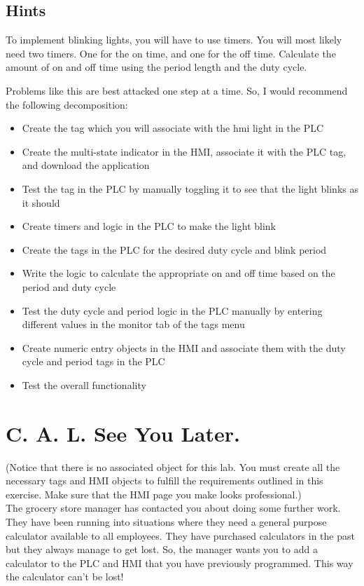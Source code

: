 \subsection{Hints}

To implement blinking lights, you will have to use timers. You will most likely need two timers. One for the on time, and one for the off time. Calculate the amount of on and off time using the period length and the duty cycle.

Problems like this are best attacked one step at a time. So, I would recommend the following decomposition:

\begin{itemize}
    \item Create the tag which you will associate with the hmi light in the PLC
    \item Create the multi-state indicator in the HMI, associate it with the PLC tag, and download the application
    \item Test the tag in the PLC by manually toggling it to see that the light blinks as it should
    \item Create timers and logic in the PLC to make the light blink
    \item Create the tags in the PLC for the desired duty cycle and blink period
    \item Write the logic to calculate the appropriate on and off time based on the period and duty cycle
    \item Test the duty cycle and period logic in the PLC manually by entering different values in the monitor tab of the tags menu
    \item Create numeric entry objects in the HMI and associate them with the duty cycle and period tags in the PLC
    \item Test the overall functionality
\end{itemize}

\TASignatureSlot



\section{C. A. L. See You Later.}
(Notice that there is no associated object for this lab. You must create all the necessary tags and HMI objects to fulfill the requirements outlined in this exercise. Make sure that the HMI page you make looks professional.)
\\


The grocery store manager has contacted you about doing some further work. They have been running into situations where they need a general purpose calculator available to all employees. They have purchased calculators in the past but they always manage to get lost. So, the manager wants you to add a calculator to the PLC and HMI that you have previously programmed. This way the calculator can't be lost!

